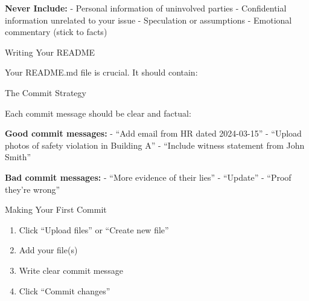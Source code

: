 \textbf{Never Include:} - Personal information of uninvolved parties -
Confidential information unrelated to your issue - Speculation or
assumptions - Emotional commentary (stick to facts)

Writing Your README

Your README.md file is crucial. It should contain:

\begin{Shaded}
\begin{Highlighting}[]



\SpecialStringTok{{-} }
\SpecialStringTok{{-} }
\SpecialStringTok{{-} }


\end{Highlighting}
\end{Shaded}

The Commit Strategy

Each commit message should be clear and factual:

\textbf{Good commit messages:} - ``Add email from HR dated 2024-03-15''
- ``Upload photos of safety violation in Building A'' - ``Include
witness statement from John Smith''

\textbf{Bad commit messages:} - ``More evidence of their lies'' -
``Update'' - ``Proof they're wrong''

Making Your First Commit

\begin{enumerate}
\def\labelenumi{\arabic{enumi}.}
\tightlist
\item
  Click ``Upload files'' or ``Create new file''
\item
  Add your file(s)
\item
  Write clear commit message
\item
  Click ``Commit changes''
\end{enumerate}

